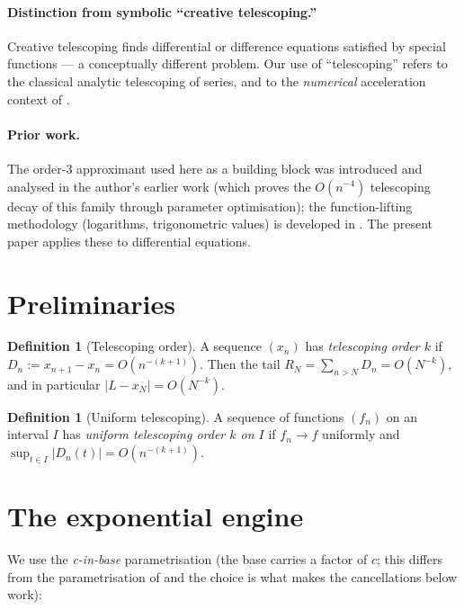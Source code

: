 \documentclass[11pt]{article}
\theoremstyle{plain}
\theoremstyle{definition}
\newtheorem{definition}[theorem]{Definition}
\theoremstyle{remark}
\begin{document}
\paragraph{Distinction from symbolic ``creative telescoping.''}
Creative telescoping \cite{Chyzak,BostanLairezSalvy} finds differential or
difference equations satisfied by special functions --- a conceptually different
problem. Our use of ``telescoping'' refers to the classical analytic telescoping
of series, and to the \emph{numerical} acceleration context of
\cite{Weniger,BrezinskiRZ}.

\paragraph{Prior work.} The order-3 approximant used here as a building block was
introduced and analysed in the author's earlier work \cite{BaldCancellation}
(which proves the $O(n^{-4})$ telescoping decay of this family through parameter
optimisation); the function-lifting methodology (logarithms, trigonometric
values) is developed in \cite{BaldFunctions}. The present paper applies these to
differential equations.

\section{Preliminaries}

\begin{definition}[Telescoping order]\label{def:order}
A sequence $(x_n)$ has \emph{telescoping order $k$} if $D_n := x_{n+1}-x_n =
O(n^{-(k+1)})$. Then the tail $R_N = \sum_{n>N}D_n = O(N^{-k})$, and in
particular $|L - x_N| = O(N^{-k})$.
\end{definition}

\begin{definition}[Uniform telescoping]\label{def:uniform}
A sequence of functions $(f_n)$ on an interval $I$ has \emph{uniform telescoping
order $k$ on $I$} if $f_n\to f$ uniformly and $\sup_{t\in I}|D_n(t)| =
O(n^{-(k+1)})$.
\end{definition}

\section{The exponential engine}

We use the \emph{c-in-base} parametrisation (the base carries a factor of $c$;
this differs from the parametrisation of \cite{BaldFunctions} and the choice is
what makes the cancellations below work):
\end{document}

